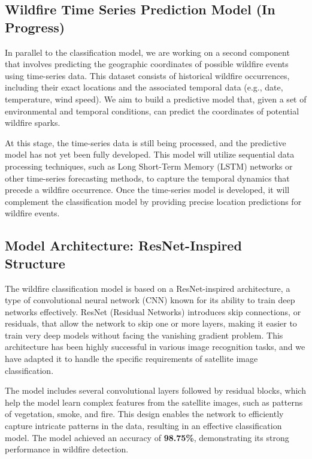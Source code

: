 \documentclass[conference]{IEEEtran}
\begin{document}
\subsection{Wildfire Time Series Prediction Model (In Progress)}
In parallel to the classification model, we are working on a second component that involves predicting the geographic coordinates of possible wildfire events using time-series data. This dataset consists of historical wildfire occurrences, including their exact locations and the associated temporal data (e.g., date, temperature, wind speed). We aim to build a predictive model that, given a set of environmental and temporal conditions, can predict the coordinates of potential wildfire sparks.

At this stage, the time-series data is still being processed, and the predictive model has not yet been fully developed. This model will utilize sequential data processing techniques, such as Long Short-Term Memory (LSTM) networks or other time-series forecasting methods, to capture the temporal dynamics that precede a wildfire occurrence. Once the time-series model is developed, it will complement the classification model by providing precise location predictions for wildfire events.

\subsection{Model Architecture: ResNet-Inspired Structure}
The wildfire classification model is based on a ResNet-inspired architecture, a type of convolutional neural network (CNN) known for its ability to train deep networks effectively. ResNet (Residual Networks) introduces skip connections, or residuals, that allow the network to skip one or more layers, making it easier to train very deep models without facing the vanishing gradient problem. This architecture has been highly successful in various image recognition tasks, and we have adapted it to handle the specific requirements of satellite image classification.

The model includes several convolutional layers followed by residual blocks, which help the model learn complex features from the satellite images, such as patterns of vegetation, smoke, and fire. This design enables the network to efficiently capture intricate patterns in the data, resulting in an effective classification model. The model achieved an accuracy of \textbf{98.75\%}, demonstrating its strong performance in wildfire detection.
\end{document}
